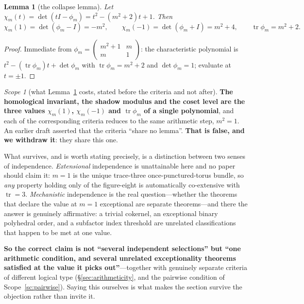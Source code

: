 \documentclass[11pt,reqno]{amsart}
\theoremstyle{plain}
\newtheorem{lemma}[theorem]{Lemma}
\theoremstyle{definition}
\theoremstyle{remark}
\newtheorem{scope}[theorem]{Scope}
\begin{document}
\begin{lemma}[the collapse lemma]\label{lem:collapse}
Let $\chi_m(t)=\det(tI-\phi_m)=t^2-(m^2+2)t+1$. Then
\[
   \chi_m(1)=\det(\phi_m-I)=-m^2,\qquad
   \chi_m(-1)=\det(\phi_m+I)=m^2+4,\qquad
   \operatorname{tr}\phi_m=m^2+2 .
\]
\end{lemma}

\begin{proof}
Immediate from $\phi_m=\left(\begin{smallmatrix}m^2+1&m\\m&1\end{smallmatrix}\right)$:
the characteristic polynomial is $t^2-(\operatorname{tr}\phi_m)t+\det\phi_m$ with
$\operatorname{tr}\phi_m=m^2+2$ and $\det\phi_m=1$; evaluate at $t=\pm1$.
\end{proof}

\begin{scope}[what Lemma~\ref{lem:collapse} costs, stated before the criteria and not after]\label{sc:collapse}
\textbf{The homological invariant, the shadow modulus and the coset level are the three
values $\chi_m(1)$, $\chi_m(-1)$ and $\operatorname{tr}\phi_m$ of a single polynomial},
and each of the corresponding criteria reduces to the same arithmetic step, $m^2=1$.
An earlier draft asserted that the criteria ``share no lemma''. \textbf{That is false,
and we withdraw it}: they share this one.

What survives, and is worth stating precisely, is a distinction between two senses of
independence. \emph{Extensional} independence is unattainable here and no paper should
claim it: $m=1$ is the unique trace-three once-punctured-torus bundle, so \emph{any}
property holding only of the figure-eight is automatically co-extensive with
$\operatorname{tr}=3$. \emph{Mechanistic} independence is the real question---whether the
theorems that declare the value at $m=1$ exceptional are separate theorems---and there
the answer is genuinely affirmative: a trivial cokernel, an exceptional binary
polyhedral order, and a subfactor index threshold are unrelated classifications that
happen to be met at one value.

\textbf{So the correct claim is not ``several independent selections'' but ``one
arithmetic condition, and several unrelated exceptionality theorems satisfied at the
value it picks out''}---together with genuinely separate criteria of different logical
type (\S\ref{sec:arithmeticity}, and the pairwise condition of Scope~\ref{sc:pairwise}).
Saying this ourselves is what makes the section survive the objection rather than invite
it.
\end{scope}
\end{document}
